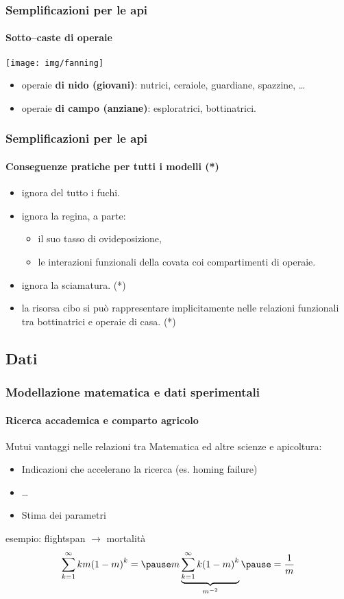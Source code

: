 \documentclass[]{beamer}
\begin{document}
\begin{frame}
    \frametitle{Semplificazioni per le api}
    \framesubtitle{Sotto--caste di operaie}

    \begin{center}
        \texttt{[image: img/fanning]}
    \end{center}

    \begin{itemize}
        \item operaie \textbf{di nido (giovani)}: \pause nutrici, ceraiole, guardiane, spazzine, \dots
        \item \pause operaie \textbf{di campo (anziane)}: \pause esploratrici, bottinatrici.
    \end{itemize}


\end{frame}

\begin{frame}
    \frametitle{Semplificazioni per le api}
    \framesubtitle{Conseguenze pratiche per tutti i modelli (*)}


    \begin{itemize}
        \item ignora del tutto i fuchi.
        \item \pause ignora la regina, a parte:
        \begin{itemize}
            \item \pause il suo tasso di ovideposizione,
            \item \pause le interazioni funzionali della covata coi compartimenti di operaie.
        \end{itemize}
        \item \pause ignora la sciamatura. (*)
        \item \pause la risorsa cibo si può rappresentare implicitamente nelle relazioni funzionali tra
            bottinatrici e operaie di casa. (*)
    \end{itemize}
\end{frame}


\subsection{Dati}


\begin{frame}
    \frametitle{Modellazione matematica e dati sperimentali}
    \framesubtitle{Ricerca accademica e comparto agricolo}

    Mutui vantaggi nelle relazioni tra Matematica ed altre scienze e apicoltura:
    \begin{itemize}
        \item Indicazioni che accelerano la ricerca \pause (es. homing failure)
        \item \pause \dots
        \item Stima dei parametri
    \end{itemize}

    \pause
    esempio: flightspan $\to$ mortalità \pause
    $$ \sum_{k=1}^{\infty} k m {(1-m)}^k = \pause
    m \underbrace{ \sum_{k=1}^{\infty} k {(1-m)}^k }_{m^{-2}}
    \pause = \frac{1}{m}$$
\end{frame}
\end{document}
